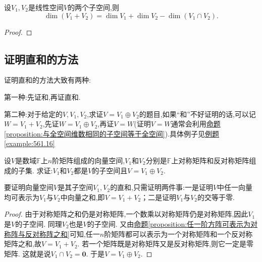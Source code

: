\documentclass[../../main.tex]{subfiles}
\begin{document}
\begin{theorem}[维数公式]\label{theorem:维数公式}
设\(V_1,V_2\)是线性空间\(V\)的两个子空间,则
\[
\dim(V_1 + V_2)=\dim V_1+\dim V_2-\dim(V_1\cap V_2).
\]
\end{theorem}
\begin{proof}

\end{proof}

\subsection{证明直和的方法}
证明直和的方法大致有两种:

第一种:先证和,再证直和. 

第二种:对于给定的\(V,V_1,V_2\),求证\(V = V_1\oplus V_2\)的题目,如果“和”不好证明的话,可以记\(W = V_1 + V_2\),先证\(W = V_1\oplus V_2\),再证\(V = W\)(证明\(V = W\)通常会利用\hyperref[proposition:与全空间维数相同的子空间等于全空间]{命题\ref{proposition:与全空间维数相同的子空间等于全空间}}).具体例子见\hyperref[example:561.16]{例题\ref{example:561.16}}

\begin{proposition}\label{proposition:矩阵空间可以分解为对称和反称矩阵空间的直和}
设\(V\)是数域\(\mathbb{F}\)上\(n\)阶矩阵组成的向量空间,\(V_1\)和\(V_2\)分别是\(\mathbb{F}\)上对称矩阵和反对称矩阵组成的子集. 求证:\(V_1\)和\(V_2\)都是\(V\)的子空间且\(V = V_1\oplus V_2\).
\end{proposition}
\begin{note}
要证明向量空间\(V\)是其子空间\(V_1,V_2\)的直和,只需证明两件事:一是证明\(V\)中任一向量均可表示为\(V_1\)与\(V_2\)中向量之和,即\(V = V_1 + V_2\)；二是证明\(V_1\)与\(V_2\)的交等于零.
\end{note}
\begin{proof}
由于对称矩阵之和仍是对称矩阵,一个数乘以对称矩阵仍是对称矩阵,因此\(V_1\)是\(V\)的子空间. 同理\(V_2\)也是\(V\)的子空间. 又由\hyperref[proposition:任一阶方阵可表示为对称阵与反对称阵之和]{命题\ref{proposition:任一阶方阵可表示为对称阵与反对称阵之和}}可知,任一\(n\)阶矩阵都可以表示为一个对称矩阵和一个反对称矩阵之和,故\(V = V_1 + V_2\). 若一个矩阵既是对称矩阵又是反对称矩阵,则它一定是零矩阵. 这就是说\(V_1\cap V_2 =\mathbf{0}\). 于是\(V = V_1\oplus V_2\). 
\end{proof}
\end{document}
